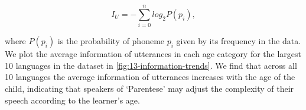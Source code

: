 $$I_U = -\sum_{i=0}^{n}{log_2P(p_i)},$$

where $P(p_i)$ is the probability of phoneme $p_i$ given by its frequency in the data. We plot the average information of utterances in each age category for the largest 10 languages in the dataset in \cref{fig:13-information-trends}. We find that across all 10 languages the average information of utterances increases with the age of the child, indicating that speakers of `Parentese' may adjust the complexity of their speech according to the learner's age. 

